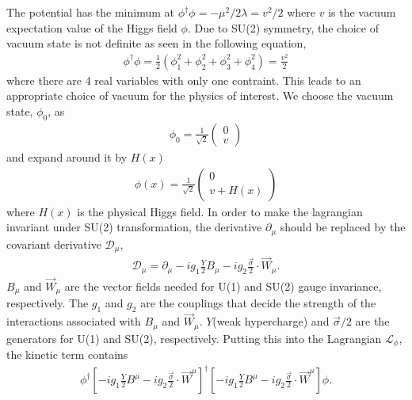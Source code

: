 The potential has the minimum at 
$ \phi^\dagger \phi = -\mu^2/2\lambda = v^2/2$ where 
$v$ is the vacuum expectation value of the Higgs field $\phi$.
Due to SU(2) symmetry, the choice of vacuum state is not definite 
as seen in the following equation, 
\begin{eqnarray} 
\phi^\dagger \phi 
= 
\frac{1}{2} \left( \phi_1^2 + \phi_2^2 + \phi_3^2 + \phi_4^2\right) 
=
\frac{v^2}{2} 
\end{eqnarray}
where there are 4 real variables with only one contraint. 
This leads to an appropriate choice of vacuum for the physics of interest. 
We choose the vacuum state, $\phi_0$, as 
\begin{eqnarray} 
\phi_0 = \frac{1}{\sqrt{2}} \left(  \begin{array}{c} 0 \\ v \end{array} \right)
\end{eqnarray} 
and expand around it by $H(x)$
\begin{eqnarray} 
\label{eq:HiggsfieldSSB}
\phi(x) = \frac{1}{\sqrt{2}} \left(  \begin{array}{c} 0 \\ v + H(x) \end{array} \right)
\end{eqnarray} 
where $H(x)$ is the physical Higgs field.  
In order to make the lagrangian invariant under SU(2) transformation,
the derivative $\partial_\mu$ should be replaced by the covariant 
derivative $\mathcal{D}_\mu$,
\begin{eqnarray} 
\mathcal{D}_\mu 
= 
\partial_\mu - ig_1 \frac{Y}{2} B_\mu - ig_2 \frac{\vec{\sigma}}{2} \cdot \overrightarrow{W}_\mu. 
\end{eqnarray} 
$B_\mu$ and $\overrightarrow{W}_\mu$ are the vector fields needed for U(1) and 
SU(2) gauge invariance, respectively. 
The $g_1$ and $g_2$ are the couplings that decide the strength of the
interactions associated with $B_\mu$ and $\overrightarrow{W}_\mu$. 
$Y$(weak hypercharge) and $\vec{\sigma}/2$ are the generators for U(1) and SU(2), respectively. 
Putting this into the Lagrangian $\mathcal{L_\phi}$, the kinetic term contains 
\begin{eqnarray}
\label{eq:kintermHiggsLag}
\phi^\dagger 
\left[ - ig_1 \frac{Y}{2} B^\mu
       - ig_2 \frac{\vec{\sigma}}{2} \cdot \overrightarrow{W}^\mu \right]^\dagger 
\left[ - ig_1 \frac{Y}{2} B^\mu
       - ig_2 \frac{\vec{\sigma}}{2} \cdot \overrightarrow{W}^\mu \right] 
\phi.  
\end{eqnarray}

